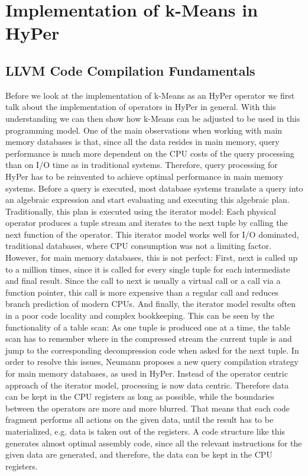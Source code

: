 \chapter{Implementation of k-Means in HyPer}\label{chapter:implementation}

\section{LLVM Code Compilation Fundamentals}

Before we look at the implementation of k-Means as an HyPer operator we first talk about the implementation of operators in HyPer in general. With this understanding we can then show how k-Means can be adjusted to be used in this programming model. One of the main observations when working with main memory databases is that, since all the data resides in main memory, query performance is much more dependent on the CPU costs of the query processing than on I/O time as in traditional systems. Therefore, query processing for HyPer has to be reinvented to achieve optimal performance in main memory systems.
Before a query is executed, most database systems translate a query into an algebraic expression and start evaluating and executing this algebraic plan. Traditionally, this plan is executed using the iterator model: Each physical operator produces a tuple stream and iterates to the next tuple by calling the next function of the operator. This iterator model works well for I/O dominated, traditional databases, where CPU consumption was not a limiting factor. However, for main memory databases, this is not perfect: First, next is called up to a million times, since it is called for every single tuple for each intermediate and final result. Since the call to next is usually a virtual call or a call via a function pointer, this call is more expensive than a regular call and reduces branch prediction of modern CPUs. And finally, the iterator model results often in a poor code locality and complex bookkeeping. This can be seen by the functionality of a table scan: As one tuple is produced one at a time, the table scan has to remember where in the compressed stream the current tuple is and jump to the corresponding decompression code when asked for the next tuple. 
In order to resolve this issues, Neumann proposes a new query compilation strategy for main memory databases, as used in HyPer. Instead of the operator centric approach of the iterator model, processing is now data centric. Therefore data can be kept in the CPU registers as long as possible, while the boundaries between the operators are more and more blurred. That means that each code fragment performs all actions on the given data, until the result has to be materialized, e.g. data is taken out of the registers. A code structure like this generates almost optimal assembly code, since all the relevant instructions for the given data are generated, and therefore, the data can be kept in the CPU registers.

